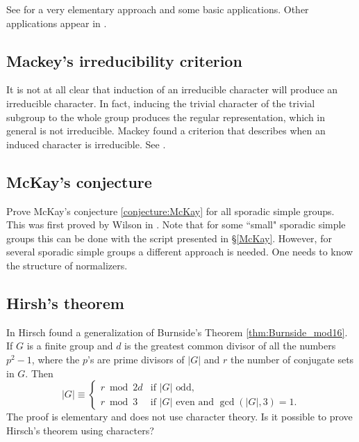 See \cite[\S5]{MR2867444} for a very elementary approach and some
basic applications. Other applications 
appear in \cite{MR1695775}.

\subsection*{Mackey's irreducibility criterion}

It is not at all clear that 
induction of an irreducible character will produce an irreducible character. In fact, 
inducing the trivial character of the trivial subgroup to the whole group produces the 
regular representation, which in general is not irreducible. Mackey found a criterion 
that describes when an induced character is irreducible. See \cite[\S8.3]{MR2867444}. 

\subsection*{McKay's conjecture}

Prove McKay's conjecture \ref{conjecture:McKay} for all sporadic simple groups. 
This was first proved by Wilson in \cite{MR1643110}. 
Note that
for some ``small" sporadic simple groups this can be done
with the script presented in \S\ref{McKay}. However, 
for several sporadic simple groups a different approach is needed. One needs
to know the structure of normalizers. 




\subsection*{Hirsh's theorem}

In \cite{MR36755} Hirsch found a generalization of Burnside's Theorem \ref{thm:Burnside_mod16}.  
If $G$ is a finite group and $d$ is the greatest common divisor of all 
the numbers $p^2-1$, where the $p$'s are prime divisors of $|G|$ and $r$ the number of conjugate sets in $G$. Then 
\[
|G|\equiv\begin{cases} 
    r\bmod 2d &\text{if $|G|$ odd,}\\
    r\bmod 3 & \text{if $|G|$ even and $\gcd(|G|,3)=1$.}
    \end{cases}
\]
The proof is elementary and does not use character theory. Is it possible
to prove Hirsch's theorem using characters?

